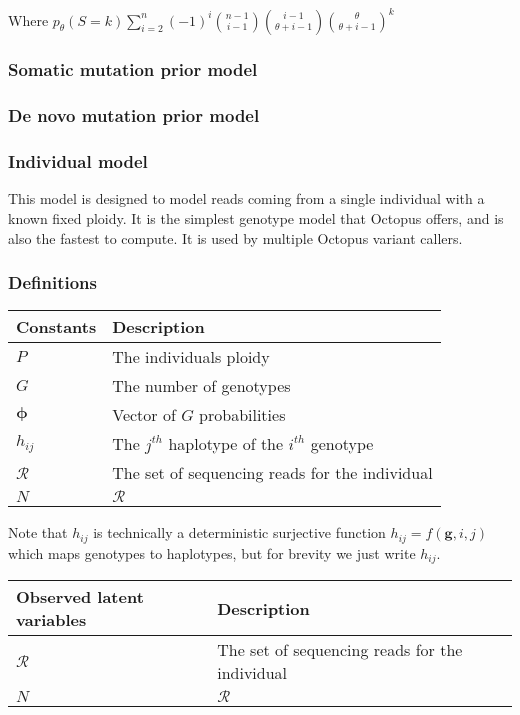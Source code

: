 \documentclass{article}
\begin{document}
Where $p_\theta(S = k)\sum_{i=2}^n (-1)^i \binom{n - 1}{i - 1} \binom{i - 1}{\theta + i - 1} \binom{\theta}{\theta + i - 1}^k$

\subsubsection{Somatic mutation prior model}

\subsubsection{De novo mutation prior model}

\subsubsection{Individual model}

This model is designed to model reads coming from a single individual with a known fixed ploidy. It is the simplest genotype model that Octopus offers, and is also the fastest to compute. It is used by multiple Octopus variant callers.

\subsubsection{Definitions}

\begin{center}
\begin{tabular}{ll}
Constants & Description \\
\hline
$P$ & The individuals ploidy \\
$G$ & The number of genotypes \\
$\boldsymbol{\phi}$ & Vector of $G$ probabilities \\
$h_{ij}$ & The $j^{th}$ haplotype of the $i^{th}$ genotype \\
$\mathcal{R}$ & The set of sequencing reads for the individual \\
$N$ & $\mathcal{R}$ \\
\hline
\end{tabular}
\end{center}

Note that $h_{ij}$ is technically a deterministic surjective function $h_{ij} = f(\boldsymbol{g}, i, j)$ which maps genotypes to haplotypes, but for brevity we just write $h_{ij}$.

\begin{center}
\begin{tabular}{ll}
Observed latent variables & Description \\
\hline
$\mathcal{R}$ & The set of sequencing reads for the individual \\
$N$ & $\mathcal{R}$ \\
\hline
\end{tabular}
\end{center}
\end{document}
